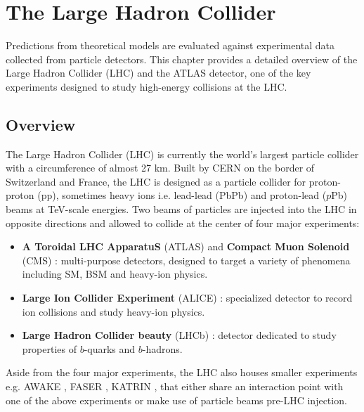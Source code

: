 \documentclass[../thesis.tex]{subfiles}
\begin{document}
\vspace{-1\baselineskip}

\section{The Large Hadron Collider}
\label{sec:LHC}
Predictions from theoretical models are evaluated against experimental data collected from particle detectors. This chapter provides a detailed overview of the Large Hadron Collider (\acs{LHC}) and the \acs{ATLAS} detector, one of the key experiments designed to study high-energy collisions at the \acs{LHC}.

\subsection{Overview}
The Large Hadron Collider \citep{Evans:2008zzb} (\acs{LHC}) is currently the world's largest particle collider with a circumference of almost 27 km. Built by \acs{CERN} on the border of Switzerland and France, the \acs{LHC} is designed as a particle collider for proton-proton (\acs{pp}), sometimes heavy ions i.e. lead-lead (PbPb) and proton-lead ($p$Pb) beams at TeV-scale energies. Two beams of particles are injected into the \acs{LHC} in opposite directions and allowed to collide at the center of four major experiments:
\begin{itemize}
\item \textbf{A Toroidal LHC ApparatuS} (\acs{ATLAS}) \citep{atlas} and \textbf{Compact Muon Solenoid} (\acs{CMS}) \citep{cms}: multi-purpose detectors, designed to target a variety of phenomena including \acs{SM}, \acs{BSM} and heavy-ion physics.
\item \textbf{Large Ion Collider Experiment} (\acs{ALICE}) \citep{alice}: specialized detector to record ion collisions and study heavy-ion physics.
\item \textbf{Large Hadron Collider beauty} (\acs{LHCb}) \citep{lhcb}: detector dedicated to study properties of $b$-quarks and $b$-hadrons.
\end{itemize}

Aside from the four major experiments, the \acs{LHC} also houses smaller experiments e.g. \acs{AWAKE} \citep{awake}, \acs{FASER} \citep{faser}, \acs{KATRIN} \citep{katrin}, that either share an interaction point with one of the above experiments or make use of particle beams pre-\acs{LHC} injection.
\end{document}
